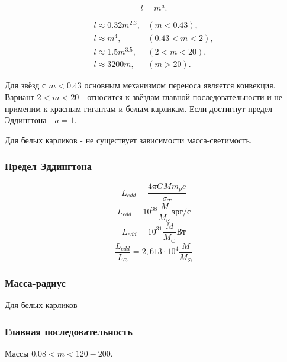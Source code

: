 \begin{equation}
	l = m^a.
\end{equation}

\begin{equation}
\begin{array}{ll}
	l \approx 0.32m^{2.3}, & (m<0.43), \\
	l \approx m^{4}, & (0.43<m<2), \\
	l \approx 1.5m^{3.5}, & (2<m<20), \\
	l \approx 3200m, & (m>20).
\end{array}
\end{equation}

Для звёзд с $m<0.43$ основным механизмом переноса является конвекция. 
Вариант $2<m<20$ - относится к звёздам главной последовательности и не применим к красным гигантам и белым карликам.
Если достигнут предел Эддингтона - $a=1$.

Для белых карликов - не существует зависимости масса-светимость.


\subsubsection{Предел Эддингтона}

\begin{equation}L_{edd} = \frac{4\pi GM m_p c}{\sigma_T}\end{equation}
\begin{equation}L_{edd} = 10^{38}\frac{M}{M_\odot}\mbox{эрг/с}\end{equation}
\begin{equation*}L_{edd} = 10^{31}\frac{M}{M_\odot}\mbox{Вт}\end{equation*}
\begin{equation}\frac{L_{edd}}{L_\odot} = 2,613\cdot 10^{4}\frac{M}{M_\odot}\end{equation}

\subsubsection{Масса-радиус}

Для белых карликов



\subsubsection{Главная последовательность}
Массы $0.08<m<120-200$.

